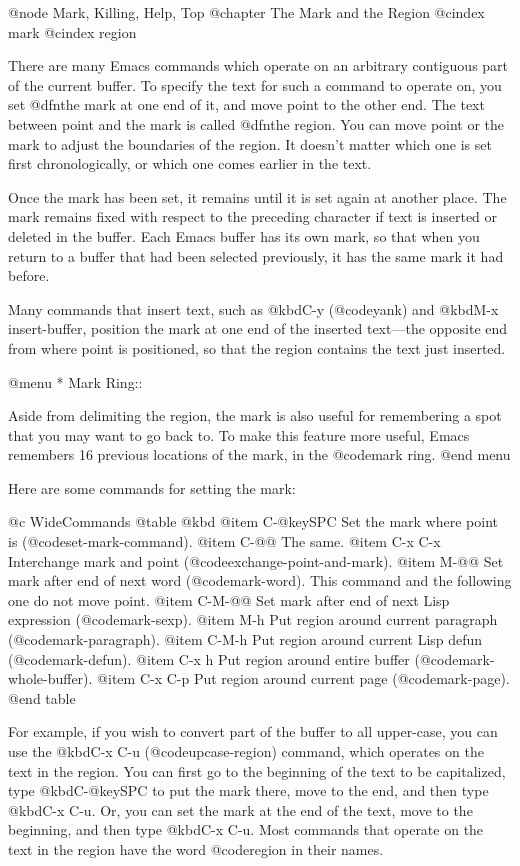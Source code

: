 {{{{{@node Mark, Killing, Help, Top
@chapter The Mark and the Region
@cindex mark
@cindex region

  There are many Emacs commands which operate on an arbitrary contiguous
part of the current buffer.  To specify the text for such a command to
operate on, you set @dfn{the mark} at one end of it, and move point to the
other end.  The text between point and the mark is called @dfn{the region}.
You can move point or the mark to adjust the boundaries of the region.  It
doesn't matter which one is set first chronologically, or which one comes
earlier in the text.

  Once the mark has been set, it remains until it is set again at another
place.  The mark remains fixed with respect to the preceding character if
text is inserted or deleted in the buffer.  Each Emacs buffer has its own
mark, so that when you return to a buffer that had been selected
previously, it has the same mark it had before.

  Many commands that insert text, such as @kbd{C-y} (@code{yank}) and
@kbd{M-x insert-buffer}, position the mark at one end of the inserted
text---the opposite end from where point is positioned, so that the region
contains the text just inserted.

@menu
* Mark Ring::

  Aside from delimiting the region, the mark is also useful for remembering
a spot that you may want to go back to.  To make this feature more useful,
Emacs remembers 16 previous locations of the mark, in the @code{mark ring}.
@end menu

  Here are some commands for setting the mark:

@c WideCommands
@table @kbd
@item C-@key{SPC}
Set the mark where point is (@code{set-mark-command}).
@item C-@@
The same.
@item C-x C-x
Interchange mark and point (@code{exchange-point-and-mark}).
@item M-@@
Set mark after end of next word (@code{mark-word}).  This command and
the following one do not move point.
@item C-M-@@
Set mark after end of next Lisp expression (@code{mark-sexp}).
@item M-h
Put region around current paragraph (@code{mark-paragraph}).
@item C-M-h
Put region around current Lisp defun (@code{mark-defun}).
@item C-x h
Put region around entire buffer (@code{mark-whole-buffer}).
@item C-x C-p
Put region around current page (@code{mark-page}).
@end table

  For example, if you wish to convert part of the buffer to all upper-case,
you can use the @kbd{C-x C-u} (@code{upcase-region}) command, which operates
on the text in the region.  You can first go to the beginning of the text
to be capitalized, type @kbd{C-@key{SPC}} to put the mark there, move to
the end, and then type @kbd{C-x C-u}.  Or, you can set the mark at the end
of the text, move to the beginning, and then type @kbd{C-x C-u}.  Most
commands that operate on the text in the region have the word @code{region}
in their names.

}}}}}
